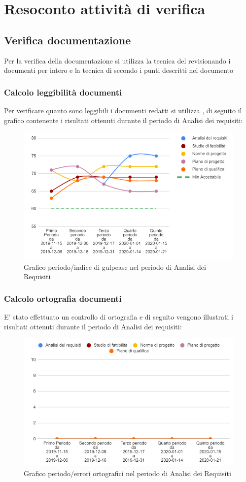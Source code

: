 \section{Resoconto attività di verifica}

\subsection{Verifica documentazione}
Per la verifica della documentazione si utilizza la tecnica del  revisionando i documenti per intero e la tecnica di  secondo i punti descritti nel documento 

\subsubsection{Calcolo leggibilità documenti}
Per verificare quanto sono leggibili i documenti redatti si utilizza , di seguito il grafico contenente i risultati ottenuti durante il periodo di Analisi dei requisiti:

\begin{figure}[H]
	\centering
	\includegraphics[width=0.8\linewidth]{./res/images/gulpease.png}
	\caption{Grafico periodo/indice di gulpease nel periodo di Analisi dei Requisiti}
	\label{fig:Grafico indice di gulpease periodo di Analisi dei Requisiti}
\end{figure}

\subsubsection{Calcolo ortografia documenti}
E' stato effettuato un controllo di ortografia e di seguito vengono illustrati i risultati ottenuti durante il periodo di Analisi dei requisiti:

\begin{figure}[H]
	\centering
	\includegraphics[width=0.8\linewidth]{./res/images/ortografia.png}
	\caption{Grafico periodo/errori ortografici nel periodo di Analisi dei Requisiti}
	\label{fig:Grafico errori ortografici periodo di Analisi dei Requisiti}
\end{figure}